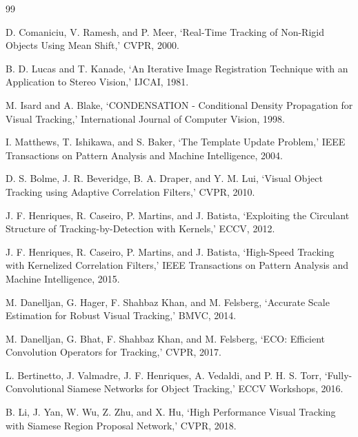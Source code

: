 \documentclass[bachelorthesis]{fer}
\numberwithin{equation}{chapter}
\begin{document}
    \clearpage
    \begin{thebibliography}{99}

         D. Comaniciu, V. Ramesh, and P. Meer, `Real-Time Tracking of Non-Rigid Objects
        Using Mean Shift,' CVPR, 2000.

         B. D. Lucas and T. Kanade, `An Iterative Image Registration Technique with an
        Application to Stereo Vision,' IJCAI, 1981.

         M. Isard and A. Blake, `CONDENSATION - Conditional Density Propagation for Visual
        Tracking,' International Journal of Computer Vision, 1998.

         I. Matthews, T. Ishikawa, and S. Baker, `The Template Update Problem,' IEEE
        Transactions on Pattern Analysis and Machine Intelligence, 2004.

         D. S. Bolme, J. R. Beveridge, B. A. Draper, and Y. M. Lui, `Visual Object Tracking
        using Adaptive Correlation Filters,' CVPR, 2010.

         J. F. Henriques, R. Caseiro, P. Martins, and J. Batista, `Exploiting the Circulant
        Structure of Tracking-by-Detection with Kernels,' ECCV, 2012.

         J. F. Henriques, R. Caseiro, P. Martins, and J. Batista, `High-Speed Tracking with
        Kernelized Correlation Filters,' IEEE Transactions on Pattern Analysis and Machine
        Intelligence, 2015.

         M. Danelljan, G. Hager, F. Shahbaz Khan, and M. Felsberg, `Accurate Scale
        Estimation for Robust Visual Tracking,' BMVC, 2014.

         M. Danelljan, G. Bhat, F. Shahbaz Khan, and M. Felsberg, `ECO: Efficient
        Convolution Operators for Tracking,' CVPR, 2017.

         L. Bertinetto, J. Valmadre, J. F. Henriques, A. Vedaldi, and P. H. S. Torr,
        `Fully-Convolutional Siamese Networks for Object Tracking,' ECCV Workshops, 2016.

         B. Li, J. Yan, W. Wu, Z. Zhu, and X. Hu, `High Performance Visual Tracking with
        Siamese Region Proposal Network,' CVPR, 2018.


\end{thebibliography}
\end{document}
